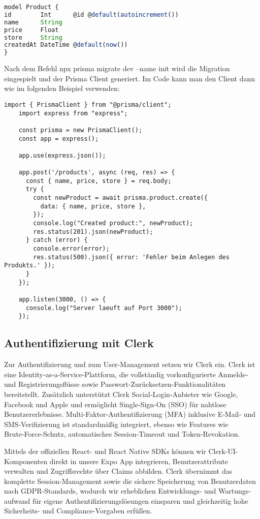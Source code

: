 \begin{lstlisting}[language=TypeScript,caption={Schema-Definition mit Prisma}]
model Product {
id        Int      @id @default(autoincrement())
name      String
price     Float
store     String
createdAt DateTime @default(now())
}
\end{lstlisting}

Nach dem Befehl npx prisma migrate dev --name init wird die Migration eingespielt und der Prisma Client generiert. Im Code kann man den Client dann wie im folgenden Beispiel verwenden:

\begin{lstlisting}[style=typescriptstyle,caption={Beispielhafte Verwendung des Prisma Client}]
    import { PrismaClient } from "@prisma/client";
    import express from "express";
    
    const prisma = new PrismaClient();
    const app = express();
    
    app.use(express.json());
    
    app.post('/products', async (req, res) => {
      const { name, price, store } = req.body;
      try {
        const newProduct = await prisma.product.create({
          data: { name, price, store },
        });
        console.log("Created product:", newProduct);
        res.status(201).json(newProduct);
      } catch (error) {
        console.error(error);
        res.status(500).json({ error: 'Fehler beim Anlegen des Produkts.' });
      }
    });
    
    app.listen(3000, () => {
      console.log("Server laeuft auf Port 3000");
    });
    \end{lstlisting}

\subsection{Authentifizierung mit Clerk}
Zur Authentifizierung und zum User-Management setzen wir Clerk ein. Clerk ist eine Identity‑as‑a‑Service‑Plattform, die vollständig vorkonfigurierte Anmelde‑ und Registrierungsflüsse sowie Passwort‑Zurücksetzen‑Funktionalitäten bereitstellt. Zusätzlich unterstützt Clerk Social‑Login‑Anbieter wie Google, Facebook und Apple und ermöglicht Single‑Sign‑On (SSO) für nahtlose Benutzererlebnisse. Multi‑Faktor‑Authentifizierung (MFA) inklusive E‑Mail‑ und SMS‑Verifizierung ist standardmäßig integriert, ebenso wie Features wie Brute‑Force‑Schutz, automatisches Session‑Timeout und Token‑Revokation.

Mittels der offiziellen React- und React Native SDKs können wir Clerk‑UI-Komponenten direkt in unsere Expo App integrieren, Benutzerattribute verwalten und Zugriffsrechte über Claims abbilden. Clerk übernimmt das komplette Session‑Management sowie die sichere Speicherung von Benutzerdaten nach GDPR‑Standards, wodurch wir erheblichen Entwicklungs- und Wartungs­aufwand für eigene Authentifizierungslösungen einsparen und gleichzeitig hohe Sicherheits- und Compliance-Vorgaben erfüllen.


